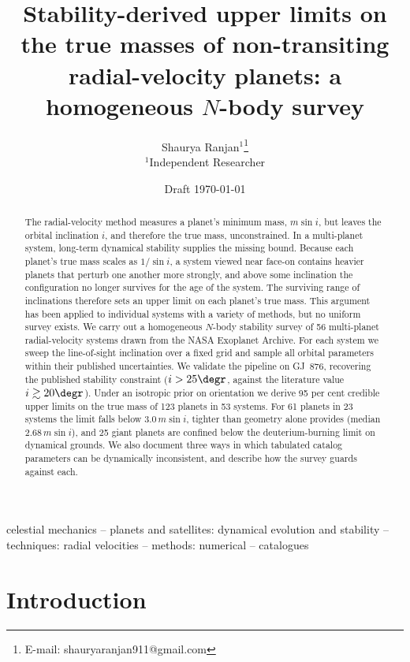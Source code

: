\documentclass[fleqn,usenatbib]{mnras}
\title[Stability-derived true-mass limits for RV planets]{Stability-derived
upper limits on the true masses of non-transiting radial-velocity planets:
a homogeneous $N$-body survey}
\author[S. Ranjan]{Shaurya Ranjan$^{1}$\thanks{E-mail:
shauryaranjan911@gmail.com}\\
$^{1}$Independent Researcher}
\date{Draft \today}
\newcommand{\msini}{m\sin i}
\begin{document}
\label{firstpage}
\maketitle

\begin{abstract}
The radial-velocity method measures a planet's minimum mass, $\msini$, but
leaves the orbital inclination $i$, and therefore the true mass,
unconstrained. In a multi-planet system, long-term dynamical stability
supplies the missing bound. Because each planet's true mass scales as
$1/\sin i$, a system viewed near face-on contains heavier planets that
perturb one another more strongly, and above some inclination the
configuration no longer survives for the age of the system. The surviving
range of inclinations therefore sets an upper limit on each planet's true
mass. This argument has been applied to individual systems with a variety
of methods, but no uniform survey exists. We carry out a homogeneous
$N$-body stability survey of 56 multi-planet radial-velocity systems drawn
from the NASA Exoplanet Archive. For each system we sweep the
line-of-sight inclination over a fixed grid and sample all orbital
parameters within their published uncertainties. We validate the pipeline
on GJ~876, recovering the published stability constraint ($i > 25\degr$,
against the literature value $i \gtrsim 20\degr$). Under an isotropic prior
on orientation we derive 95 per cent credible upper limits on the true
mass of 123 planets in 53 systems. For 61 planets in 23 systems the limit
falls below $3.0\,\msini$, tighter than geometry alone provides (median
$2.68\,\msini$), and 25 giant planets are confined below the
deuterium-burning limit on dynamical grounds. We also document three ways
in which tabulated catalog parameters can be dynamically inconsistent, and
describe how the survey guards against each.
\end{abstract}

\begin{keywords}
celestial mechanics -- planets and satellites: dynamical evolution and
stability -- techniques: radial velocities -- methods: numerical --
catalogues
\end{keywords}

\section{Introduction} \label{sec:intro}
\end{document}
